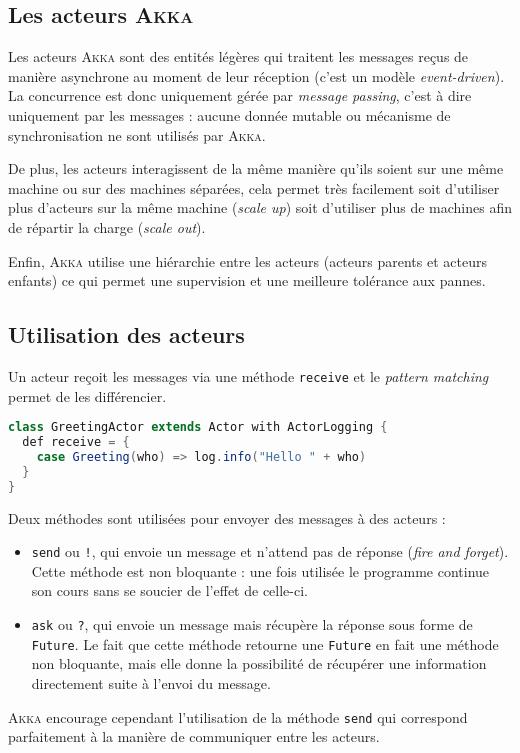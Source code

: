 \documentclass[11pt,a4paper]{article}
\begin{document}
\subsection{Les acteurs \textsc{Akka}}
Les acteurs \textsc{Akka} sont des entités légères qui traitent les messages reçus de manière asynchrone au moment de leur réception (c'est un modèle \textit{event-driven}). La concurrence est donc uniquement gérée par \textit{message passing}, c'est à dire uniquement par les messages : aucune donnée mutable ou mécanisme de synchronisation ne sont utilisés par \textsc{Akka}. 

De plus, les acteurs interagissent de la même manière qu'ils soient sur une même machine ou sur des machines séparées, cela permet très facilement soit d'utiliser plus d'acteurs sur la même machine (\textit{scale up}) soit d'utiliser plus de machines afin de répartir la charge (\textit{scale out}).

Enfin, \textsc{Akka} utilise une hiérarchie entre les acteurs (acteurs parents et acteurs enfants) ce qui permet une supervision et une meilleure tolérance aux pannes.

\subsection{Utilisation des acteurs}
Un acteur reçoit les messages via une méthode \texttt{receive} et le \textit{pattern matching} permet de les différencier.
\begin{lstlisting}[language = java]
class GreetingActor extends Actor with ActorLogging {
  def receive = {
	case Greeting(who) => log.info("Hello " + who)
  }
}
\end{lstlisting}

Deux méthodes sont utilisées pour envoyer des messages à des acteurs : 
\begin{itemize}
\item \texttt{send} ou \texttt{!}, qui envoie un message et n'attend pas de réponse (\textit{fire and forget}). Cette méthode est non bloquante : une fois utilisée le programme continue son cours sans se soucier de l'effet de celle-ci.
\item \texttt{ask} ou \texttt{?}, qui envoie un message mais récupère la réponse sous forme de \texttt{Future}. Le fait que cette méthode retourne une \texttt{Future} en fait une méthode non bloquante, mais elle donne la possibilité de récupérer une information directement suite à l'envoi du message.\\
\end{itemize}

\textsc{Akka} encourage cependant l'utilisation de la méthode \texttt{send} qui correspond parfaitement à la manière de communiquer entre les acteurs.

\nocite{*}
{}
\end{document}
